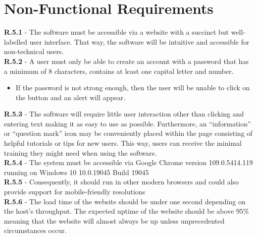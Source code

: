 \documentclass[a4paper]{article}
\theoremstyle{plain}
\theoremstyle{definition}
\theoremstyle{remark}
\begin{document}
\section*{Non-Functional Requirements} 
\textbf{R.5.1} - The software must be accessible via a website with a succinct but well-labelled user interface. That way, the software will be intuitive and accessible for non-technical users. \\
\noindent\textbf{R.5.2} - A user must only be able to create an account with a password that has a minimum of 8 characters, contains at least one capital letter and number.
\vspace{-0.15cm}
\begin{itemize}
	\item If the password is not strong enough, then the user will be unable to click on the button and an alert will appear. 
\end{itemize}
\noindent\textbf{R.5.3} - The software will require little user interaction other than clicking and entering text making it as easy to use as possible. Furthermore, an “information” or “question mark” icon may be conveniently placed within the page consisting of helpful tutorials or tips for new users. This way, users can receive the minimal training they might need when using the software. \\

\noindent\textbf{R.5.4} - The system must be accessible via Google Chrome version 109.0.5414.119 running on Windows 10 10.0.19045 Build 19045 \\

\noindent\textbf{R.5.5} - Consequently, it should run in other modern browsers and could also provide support for mobile-friendly resolutions  \\

\noindent\textbf{R.5.6} - The load time of the website should be under one second depending on the host’s throughput. The expected uptime of the website should be above $95\%$ meaning that the website will almost always be up unless unprecedented circumstances occur.


\end{document}
